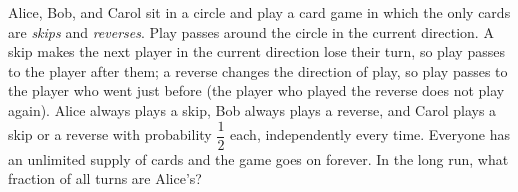 Alice, Bob, and Carol sit in a circle and play a card game in which the only cards are \emph{skips} and \emph{reverses}. Play passes around the circle in the current direction. A skip makes the next player in the current direction lose their turn, so play passes to the player after them; a reverse changes the direction of play, so play passes to the player who went just before (the player who played the reverse does not play again). Alice always plays a skip, Bob always plays a reverse, and Carol plays a skip or a reverse with probability $\dfrac{1}{2}$ each, independently every time. Everyone has an unlimited supply of cards and the game goes on forever. In the long run, what fraction of all turns are Alice's?
